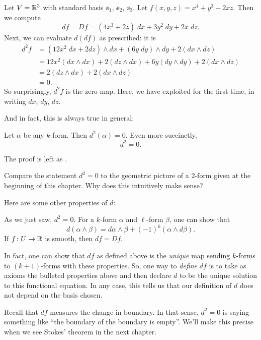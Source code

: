 \begin{example}
	Let $V = \mathbb R^3$ with standard basis $\ee_1$, $\ee_2$, $\ee_3$.
	Let $f(x,y,z) = x^4 + y^3 + 2xz$.
	Then we compute
	\[ df = Df = (4x^3+2z) \; dx + 3y^2 \; dy + 2x \; dz. \]
	Next, we can evaluate $d(df)$ as prescribed: it is
	\begin{align*}
		d^2f &= (12x^2 \; dx + 2 dz) \wedge dx + (6y \; dy) \wedge dy
		+ 2(dx \wedge dz) \\
		&= 12x^2 (dx \wedge dx) + 2(dz \wedge dx) + 6y (dy \wedge dy) + 2(dx \wedge dz) \\
		&= 2(dz \wedge dx) + 2(dx \wedge dz) \\
		&= 0.
	\end{align*}
	So surprisingly, $d^2f$ is the zero map.
	Here, we have exploited  for the first time,
	in writing $dx$, $dy$, $dz$.
\end{example}
And in fact, this is always true in general:
\begin{theorem}
	\label{thm:dd_zero}
	Let $\alpha$ be any $k$-form.
	Then $d^2(\alpha) = 0$.
	Even more succinctly, \[ d^2 = 0. \]
\end{theorem}
The proof is left as .
\begin{exercise}
	Compare the statement $d^2 = 0$ to the geometric
	picture of a $2$-form given at the beginning of this chapter.
	Why does this intuitively make sense?
\end{exercise}

Here are some other properties of $d$:
\begin{itemize}
	\ii As we just saw, $d^2 = 0$.
	\ii For a $k$-form $\alpha$ and $\ell$-form $\beta$, one can show that
	\[ d(\alpha \wedge \beta) = d\alpha \wedge \beta + (-1)^k (\alpha \wedge d\beta). \]
	\ii If $f \colon U \to \mathbb R$ is smooth, then $df = Df$.
\end{itemize}
In fact, one can show that $df$ as defined above is
the \emph{unique} map sending $k$-forms to $(k+1)$-forms
with these properties.
So, one way to \emph{define} $df$ is to take as axioms
the bulleted properties above
and then declare $d$ to be the unique solution to this functional equation.
In any case, this tells us that our definition of $d$
does not depend on the basis chosen.

Recall that $df$ measures the change in boundary.
In that sense, $d^2 = 0$ is saying something like
``the boundary of the boundary is empty''.
We'll make this precise when we see Stokes' theorem in the next chapter.

